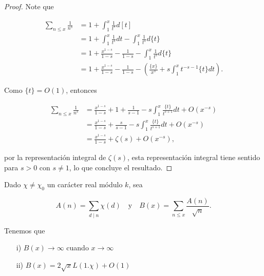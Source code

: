 \begin{proof}
Note que 

\begin{align*}
    \sum_{n\leq x}\frac{1}{n^s}&=1+\int_1^x\frac{1}{t^s}d[t]\\
    &=1+\int_1^x\frac{1}{t^s}dt-\int_1^x\frac{1}{t^s}d\{t\}\\
    &=1+\frac{x^{1-s}}{1-s}-\frac{1}{1-s}-\int_1^x\frac{1}{t^s}d\{t\}\\
    &=1+\frac{x^{1-s}}{1-s}-\frac{1}{1-s}-\left(\frac{\{x\}}{x^s}+s\int_1^xt^{-s-1}\{t\}dt\right)  
.\end{align*}

Como $\{t\}=O(1)$, entonces 

\begin{align*}
    \sum_{n\leq x}\frac{1}{n^s}&=\frac{x^{1-s}}{1-s}+1+\frac{1}{s-1}-s\int_1^x\frac{\{t\}}{t^{s+1}}dt+O(x^{-s})\\
    &=\frac{x^{1-s}}{1-s}+\frac{s}{s-1}-s\int_1^x \frac{\{t\}}{t^{s+1}}dt+O(x^{-s})\\
    &=\frac{x^{1-s}}{1-s}+\zeta(s)+O(x^{-s})
,\end{align*}

por la representación integral de $\zeta(s)$, esta representación integral tiene sentido para $s>0$ con $s\neq 1$, lo que concluye el resultado.
\end{proof}


\begin{theorem}
Dado $\chi\neq\chi_0$ un carácter real módulo $k$, sea

$$A(n)=\sum_{d\mid n}\chi(d)\quad \text{y} \quad B(x)=\sum_{n\leq x}\frac{A(n)}{\sqrt{n}}.$$

Tenemos que

\begin{itemize}
\item[i)] $B(x)\to\infty$ cuando $x\to\infty$

\item[ii)] $B(x)=2 \sqrt{x} L(1.\chi)+O(1)$
\end{itemize}
\end{theorem}

